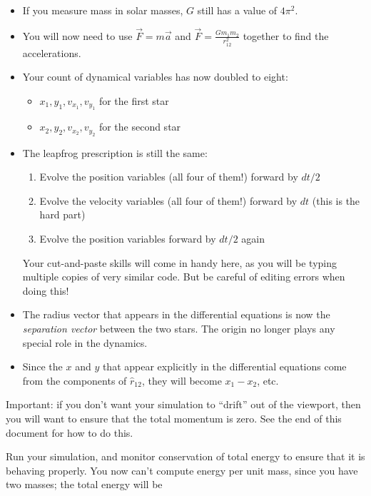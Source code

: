 \documentclass[12pt]{article}
\begin{document}
\begin{enumerate}
{    \begin{itemize}
      \item{If you measure mass in solar masses, $G$ still has a value of $4\pi^2$.}
      \item{You will now need to use $\vec F=m\vec a$ and $\vec F=\frac{Gm_1m_2}{r_{12}^2}$
             together to find the accelerations.}
      \item{Your count of dynamical variables has now doubled to eight:
          \begin{itemize}
            \item{$x_1, y_1, v_{x_1}, v_{y_1}$ for the first star}
            \item{$x_2, y_2, v_{x_2}, v_{y_2}$ for the second star}
          \end{itemize}
       }
     \item {
          The leapfrog prescription is still the same: 
            \begin{enumerate}
              \item Evolve the position variables (all four of them!) forward by $dt/2$
              \item Evolve the velocity variables (all four of them!) forward by $dt$ (this is the hard part)
              \item Evolve the position variables forward by $dt/2$ again
            \end{enumerate}
            Your cut-and-paste skills will come in handy here, as you will be typing
            multiple copies of very similar code. But be careful of editing errors when doing this!
          }
  
      \item{The radius vector that appears in the differential equations is now the {\it separation vector} between the two stars. The origin no longer plays any special role in the dynamics.}
      \item{Since the $x$ and $y$ that appear explicitly in the differential equations come from the components of $\hat r_{12}$, they will become $x_1-x_2$, etc.}
    \end{itemize}

\item Important: if you don't want your simulation to ``drift'' out of the viewport, 
then you will want to ensure that the total momentum is zero. See the end of this document
for how to do this.

   Run your simulation, and monitor conservation of total energy to ensure that it is behaving properly. You now can't compute energy per unit mass, since you have two masses; the total energy will be

}
\end{enumerate}
\end{document}
